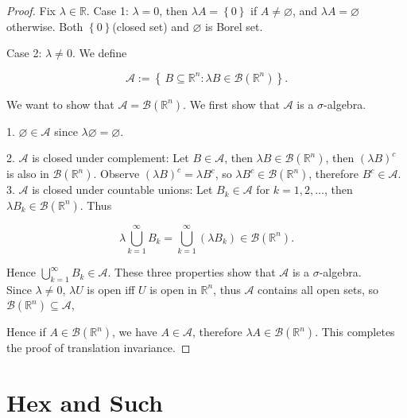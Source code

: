 \documentclass{qlnotes-export}
\begin{document}
\begin{proof}

Fix \(\lambda \in {\mathbb{R}}\). Case 1: \(\lambda = 0\), then \(\lambda A = \left\{ 0 \right\}\) if \(A \neq \varnothing\), and \(\lambda A = \varnothing\) otherwise. Both \(\left\{ 0 \right\}\)(closed set) and \(\varnothing\) is Borel set.

Case 2: \(\lambda \neq 0\). We define

\[\mathcal{A} := \left\{ {\, B \subseteq {\mathbb{R}}^{n}:\lambda B \in \mathcal{B}({\mathbb{R}}^{n})} \right\}.\]

We want to show that \(\mathcal{A} = \mathcal{B}({\mathbb{R}}^{n})\). We first show that \(\mathcal{A}\) is a \(\sigma\)-algebra.

1. \(\varnothing \in \mathcal{A}\) since \(\lambda\varnothing = \varnothing\).

2. \(\mathcal{A}\) is closed under complement: Let \(B \in \mathcal{A}\), then \(\lambda B \in \mathcal{B}({\mathbb{R}}^{n})\), then \((\lambda B)^{c}\) is also in \(\mathcal{B}({\mathbb{R}}^{n})\). Observe \((\lambda B)^{c} = \lambda B^{c}\), so \(\lambda B^{c} \in \mathcal{B}({\mathbb{R}}^{n})\), therefore \(B^{c} \in \mathcal{A}\). 3. \(\mathcal{A}\) is closed under countable unions: Let \(B_{k} \in \mathcal{A}\) for \(k = 1,2,\ldots\), then \(\lambda B_{k} \in \mathcal{B}({\mathbb{R}}^{n})\). Thus

\[\lambda\bigcup\limits_{k = 1}^{\infty}B_{k} = \bigcup\limits_{k = 1}^{\infty}(\lambda B_{k}) \in \mathcal{B}({\mathbb{R}}^{n}).\]

Hence \(\bigcup_{k = 1}^{\infty}B_{k} \in \mathcal{A}\). These three properties show that \(\mathcal{A}\) is a \(\sigma\)-algebra.\\
Since \(\lambda \neq 0\), \(\lambda U\) is open iff \(U\) is open in \({\mathbb{R}}^{n}\), thus \(\mathcal{A}\) contains all open sets, so \(\mathcal{B}({\mathbb{R}}^{n}) \subseteq \mathcal{A}\),

Hence if \(A \in \mathcal{B}({\mathbb{R}}^{n})\), we have \(A \in \mathcal{A}\), therefore \(\lambda A \in \mathcal{B}({\mathbb{R}}^{n})\). This completes the proof of translation invariance.

\end{proof}

\section{Hex and Such}\label{hex-and-such}
\end{document}
